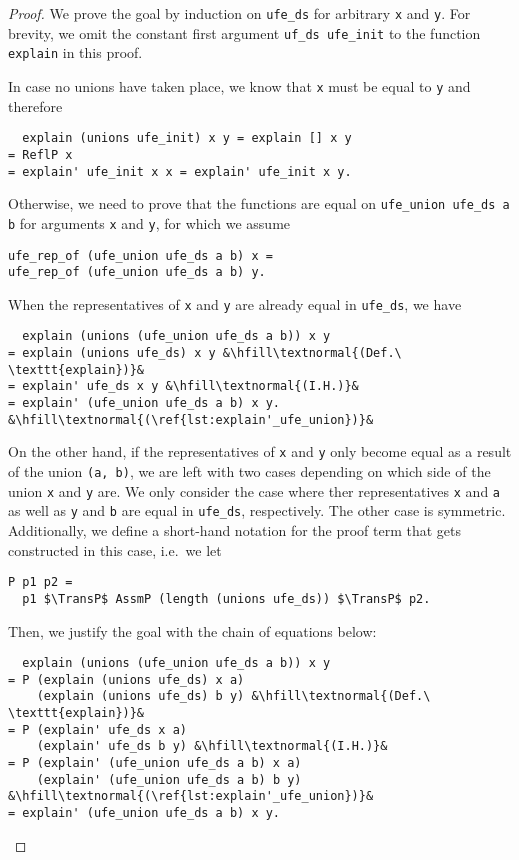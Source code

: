 \documentclass[
  sigplan,
  10pt,
  anonymous,
  review,
  ]{acmart}
\newcommand{\TransP}{\bigtriangledown}
\begin{document}
\begin{proof}
  We prove the goal by induction on \lstinline|ufe_ds| for arbitrary \lstinline|x| and \lstinline|y|.
  For brevity, we omit the constant first argument \lstinline|uf_ds ufe_init| to the function \lstinline|explain| in this proof.

  In case no unions have taken place, we know that \lstinline|x| must be equal to \lstinline|y| and therefore
  \begin{lstlisting}
  explain (unions ufe_init) x y = explain [] x y
= ReflP x
= explain' ufe_init x x = explain' ufe_init x y.
  \end{lstlisting}

  Otherwise, we need to prove that the functions are equal on \lstinline|ufe_union ufe_ds a b| for arguments \lstinline|x| and \lstinline|y|, for which we assume 
  \begin{lstlisting}
ufe_rep_of (ufe_union ufe_ds a b) x =
ufe_rep_of (ufe_union ufe_ds a b) y.
  \end{lstlisting}

  When the representatives of \lstinline|x| and \lstinline|y| are already equal in \lstinline|ufe_ds|, we have
  \begin{lstlisting}
  explain (unions (ufe_union ufe_ds a b)) x y
= explain (unions ufe_ds) x y &\hfill\textnormal{(Def.\ \texttt{explain})}&
= explain' ufe_ds x y &\hfill\textnormal{(I.H.)}&
= explain' (ufe_union ufe_ds a b) x y. &\hfill\textnormal{(\ref{lst:explain'_ufe_union})}&
  \end{lstlisting}

  On the other hand, if the representatives of \lstinline|x| and \lstinline|y| only become equal as a result of the union \lstinline|(a, b)|, we are left with two cases depending on which side of the union \lstinline|x| and \lstinline|y| are.
  We only consider the case where ther representatives \lstinline|x| and \lstinline|a| as well as \lstinline|y| and \lstinline|b| are equal in \lstinline|ufe_ds|, respectively.
  The other case is symmetric.
  Additionally, we define a short-hand notation for the proof term that gets constructed in this case, i.e.\ we let
  \begin{lstlisting}
P p1 p2 =
  p1 $\TransP$ AssmP (length (unions ufe_ds)) $\TransP$ p2.
  \end{lstlisting}
  Then, we justify the goal with the chain of equations below:
  \begin{lstlisting}
  explain (unions (ufe_union ufe_ds a b)) x y
= P (explain (unions ufe_ds) x a)
    (explain (unions ufe_ds) b y) &\hfill\textnormal{(Def.\ \texttt{explain})}&
= P (explain' ufe_ds x a) 
    (explain' ufe_ds b y) &\hfill\textnormal{(I.H.)}&
= P (explain' (ufe_union ufe_ds a b) x a)
    (explain' (ufe_union ufe_ds a b) b y) &\hfill\textnormal{(\ref{lst:explain'_ufe_union})}&
= explain' (ufe_union ufe_ds a b) x y.
  \end{lstlisting}
\end{proof}
  
\end{document}
